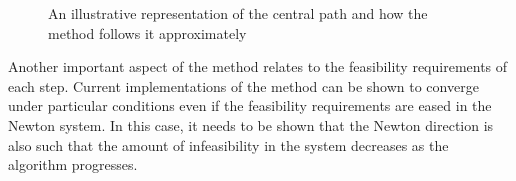 	\begin{figure}
			\caption{An illustrative representation of the central path and how the method follows it approximately}
			\label{p1c7:fig:central-path-and-neighbourhoods} 
	\end{figure}
	
Another important aspect of the method relates to the feasibility requirements of each step. Current implementations of the method can be shown to converge under particular conditions even if the feasibility requirements are eased in the Newton system. In this case, it needs to be shown that the Newton direction is also such that the amount of infeasibility in the system decreases as the algorithm progresses. 
	
